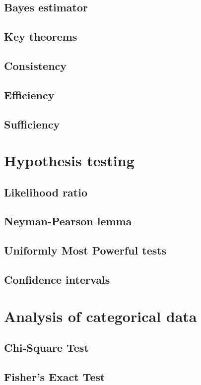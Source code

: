 \documentclass{article}
\begin{document}
\subsection{Bayes estimator}
\subsection{Key theorems}
\subsection{Consistency}
\subsection{Efficiency}
\subsection{Sufficiency}

\section{Hypothesis testing}
\subsection{Likelihood ratio}
\subsection{Neyman-Pearson lemma}
\subsection{Uniformly Most Powerful tests}
\subsection{Confidence intervals}

\section{Analysis of categorical data}
\subsection{Chi-Square Test}
\subsection{Fisher's Exact Test}
\end{document}

